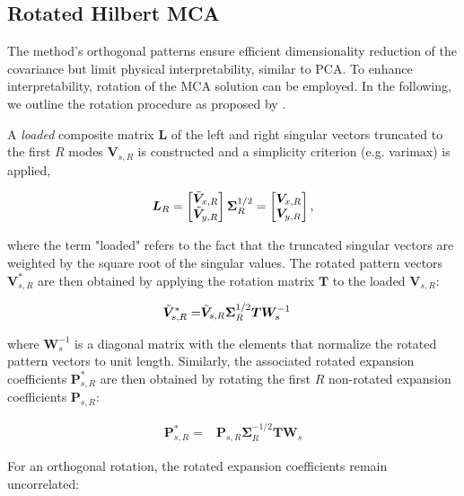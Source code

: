 \subsection{Rotated Hilbert MCA}\label{sec:theory:mca_rotated_hilbert}
The method's orthogonal patterns ensure efficient dimensionality reduction of the covariance but limit physical interpretability, similar to PCA. To enhance interpretability, rotation of the MCA solution can be employed. In the following, we outline the rotation procedure as proposed by \citet{cheng_orthogonal_1995}.

A \textit{loaded} composite matrix $\bm{L}$ of the left and right singular vectors truncated to the first $R$ modes $\bm{V}_{s,R}$ is constructed and a simplicity criterion (e.g. varimax) is applied,

\begin{align}
    \bm{L}_R = 
    \begin{bmatrix}
        \tilde{\bm{V}}_{x,R}\\
        \tilde{\bm{V}}_{y,R}
    \end{bmatrix}
    \bm{\Sigma}_R^{1/2} = \begin{bmatrix}
        \bm{V}_{x,R}\\
        \bm{V}_{y,R}
    \end{bmatrix},
\end{align}

where the term "loaded" refers to the fact that the truncated singular vectors are weighted by the square root of the singular values. The rotated pattern vectors $\bm{V}_{s,R}^*$ are then obtained by applying the rotation matrix $\bm{T}$ to the loaded $\bm{V}_{s,R}$:

\begin{align}\label{eq:theory:mca_rotated_pattern_vectors}
    \tilde{\bm{V}}_{s,R}^* =& \tilde{\bm{V}}_{s,R} \bm{\Sigma}_R^{1/2} \bm{T} \bm{W}_s^{-1}
\end{align}

where $\bm{W}_s^{-1}$ is a diagonal matrix with the elements that normalize the rotated pattern vectors to unit length. Similarly, the associated rotated expansion coefficients $\bm{P}_{s,R}^*$ are then obtained by rotating the first $R$ non-rotated expansion coefficients $\bm{P}_{s,R}$:

\begin{align}
    \bm{P}_{s,R}^* =& \bm{P}_{s,R} \bm{\Sigma}_R^{-1/2} \bm{T} \bm{W}_s
\end{align}

For an orthogonal rotation, the rotated expansion coefficients remain uncorrelated:

